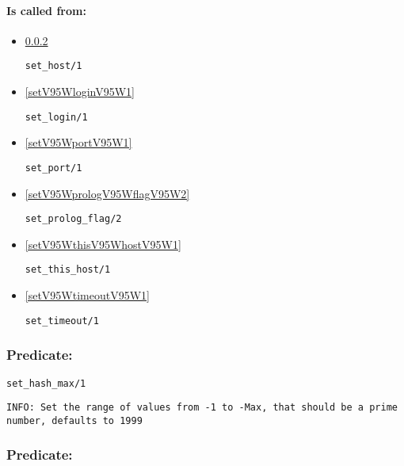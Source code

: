 \paragraph{Is called from:} 
\begin{itemize}
\item \ref{setV95WhostV95W1} 
\begin{verbatim}
set_host/1
\end{verbatim}

\item \ref{setV95WloginV95W1} 
\begin{verbatim}
set_login/1
\end{verbatim}

\item \ref{setV95WportV95W1} 
\begin{verbatim}
set_port/1
\end{verbatim}

\item \ref{setV95WprologV95WflagV95W2} 
\begin{verbatim}
set_prolog_flag/2
\end{verbatim}

\item \ref{setV95WthisV95WhostV95W1} 
\begin{verbatim}
set_this_host/1
\end{verbatim}

\item \ref{setV95WtimeoutV95W1} 
\begin{verbatim}
set_timeout/1
\end{verbatim}

\end{itemize}

\subsubsection{Predicate:} \label{setV95WhashV95WmaxV95W1}

\begin{verbatim}
set_hash_max/1
\end{verbatim}

{\small \begin{verbatim}
INFO: Set the range of values from -1 to -Max, that should be a prime number, defaults to 1999

\end{verbatim}}

\subsubsection{Predicate:} \label{setV95WhostV95W1}

